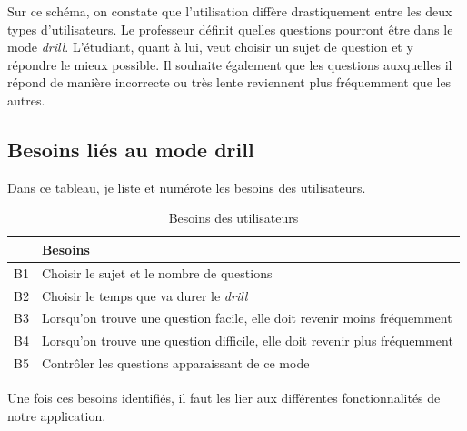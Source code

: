 
Sur ce schéma, on constate que l'utilisation diffère drastiquement entre les deux types d'utilisateurs. Le professeur définit quelles questions pourront être dans le mode \emph{drill}. L'étudiant, quant à lui, veut choisir un sujet de question et y répondre le mieux possible. Il souhaite également que les questions auxquelles il répond de manière incorrecte ou très lente reviennent plus fréquemment que les autres.

\subsection*{Besoins liés au mode drill}
Dans ce tableau, je liste et numérote les besoins des utilisateurs.
\begin{table}[h]
    \begin{center}
        \caption{Besoins des utilisateurs \label{Besoins}}
        \begin{tabular}{|l|l|}
            \hline
            \textbf{} & \textbf{Besoins}                                                            \\
            \hline
            B1        & Choisir le sujet et le nombre de questions                                  \\
            \hline
            B2        & Choisir le temps que va durer le \emph{drill}                               \\
            \hline
            B3        & Lorsqu'on trouve une question facile, elle doit revenir moins fréquemment   \\
            \hline
            B4        & Lorsqu'on trouve une question difficile, elle doit revenir plus fréquemment \\
            \hline
            B5        & Contrôler les questions apparaissant de ce mode                             \\
            \hline
        \end{tabular}
    \end{center}
\end{table}

Une fois ces besoins identifiés, il faut les lier aux différentes fonctionnalités de notre application.


